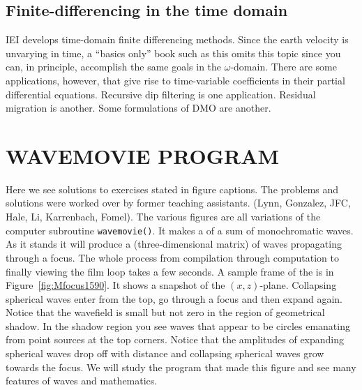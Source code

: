 \subsection{Finite-differencing in the time domain}
IEI develops time-domain finite differencing methods.
Since the earth velocity is unvarying in time,
a ``basics only'' book such as this omits
this topic since you can, in principle,
accomplish the same goals in the $\omega$-domain.
There are some applications, however,
that give rise to time-variable coefficients
in their partial differential equations.
Recursive dip filtering is one application.
Residual migration is another.
Some formulations of DMO are another.


\section{WAVEMOVIE PROGRAM}
\par
Here we see solutions to exercises stated in figure captions.
The problems and solutions were worked over by former
teaching assistants.
(Lynn, Gonzalez, JFC, Hale, Li, Karrenbach, Fomel).
The various figures are all variations
of the computer subroutine {\tt wavemovie()}.
It makes a  of a sum of monochromatic waves. 
As it stands it will produce a  (three-dimensional matrix)
of waves propagating through a focus.
The whole process from compilation through computation to finally
viewing the film loop takes a few seconds.
A sample frame of the  is in Figure~\ref{fig:Mfocus1590}.
It shows a snapshot of the $(x,z)$-plane.
Collapsing spherical waves enter from the top,
go through a focus and then expand again.
Notice that the wavefield is small but not zero in the region
of geometrical shadow.
In the shadow region you see waves that appear to be circles
emanating from point sources at the top corners.
Notice that the amplitudes of expanding spherical waves
drop off with distance and collapsing spherical waves grow
towards the focus.
We will study the program that made this figure
and see many features of waves
and mathematics.
